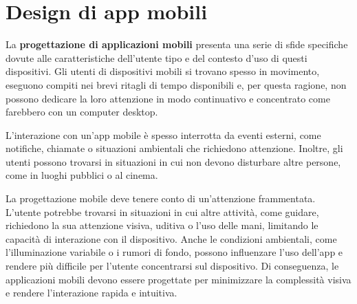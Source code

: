 \chapter{Design di app mobili}
\begin{redbar}
La \textbf{progettazione di applicazioni mobili} presenta una serie di sfide specifiche dovute alle caratteristiche dell'utente tipo e del contesto d'uso di questi dispositivi. Gli utenti di dispositivi mobili si trovano spesso in movimento, eseguono compiti nei brevi ritagli di tempo disponibili e, per questa ragione, non possono dedicare la loro attenzione in modo continuativo e concentrato come farebbero con un computer desktop. 
\end{redbar}

L’interazione con un’app mobile è spesso interrotta da eventi esterni, come notifiche, chiamate o situazioni ambientali che richiedono attenzione. Inoltre, gli utenti possono trovarsi in situazioni in cui non devono disturbare altre persone, come in luoghi pubblici o al cinema.

La progettazione mobile deve tenere conto di un’attenzione frammentata. L’utente potrebbe trovarsi in situazioni in cui altre attività, come guidare, richiedono la sua attenzione visiva, uditiva o l’uso delle mani, limitando le capacità di interazione con il dispositivo. Anche le condizioni ambientali, come l'illuminazione variabile o i rumori di fondo, possono influenzare l'uso dell'app e rendere più difficile per l'utente concentrarsi sul dispositivo. Di conseguenza, le applicazioni mobili devono essere progettate per minimizzare la complessità visiva e rendere l'interazione rapida e intuitiva.

